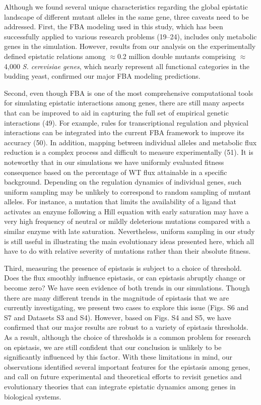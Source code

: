 Although we found several unique characteristics regarding the global
epistatic landscape of different mutant alleles in the same gene,
three caveats need to be addressed. First, the FBA modeling used in
this study, which has been successfully applied to various research
problems (19–24), includes only metabolic genes in the
simulation. However, results from our analysis on the experimentally
defined epistatic relations among $\approx$0.2 million double mutants
comprising $\approx$4,000 \textit{S. cerevisiae genes}, which nearly
represent all functional categories in the budding yeast, confirmed
our major FBA modeling predictions.

Second, even though FBA is one of the most comprehensive computational
tools for simulating epistatic interactions among genes, there are
still many aspects that can be improved to aid in capturing the full
set of empirical genetic interactions (49). For example, rules for
transcriptional regulation and physical interactions can be integrated
into the current FBA framework to improve its accuracy (50). In
addition, mapping between individual alleles and metabolic flux
reduction is a complex process and difficult to measure experimentally
(51). It is noteworthy that in our simulations we have uniformly
evaluated fitness consequence based on the percentage of WT flux
attainable in a specific background. Depending on the regulation
dynamics of individual genes, such uniform sampling may be unlikely to
correspond to random sampling of mutant alleles. For instance, a
mutation that limits the availability of a ligand that activates an
enzyme following a Hill equation with early saturation may have a very
high frequency of neutral or mildly deleterious mutations compared
with a similar enzyme with late saturation. Nevertheless, uniform
sampling in our study is still useful in illustrating the main
evolutionary ideas presented here, which all have to do with relative
severity of mutations rather than their absolute fitness.

Third, measuring the presence of epistasis is subject to a choice of
threshold. Does the flux smoothly influence epistasis, or can
epistasis abruptly change or become zero? We have seen evidence of
both trends in our simulations. Though there are many different trends
in the magnitude of epistasis that we are currently investigating, we
present two cases to explore this issue (Figs. S6 and S7 and Datasets
S3 and S4). However, based on Figs. S4 and S5, we have confirmed that
our major results are robust to a variety of epistasis thresholds. As
a result, although the choice of thresholds is a common problem for
research on epistasis, we are still confident that our conclusion is
unlikely to be significantly influenced by this factor. With these
limitations in mind, our observations identified several important
features for the epistasis among genes, and call on future
experimental and theoretical efforts to revisit genetics and
evolutionary theories that can integrate epistatic dynamics among
genes in biological systems.

